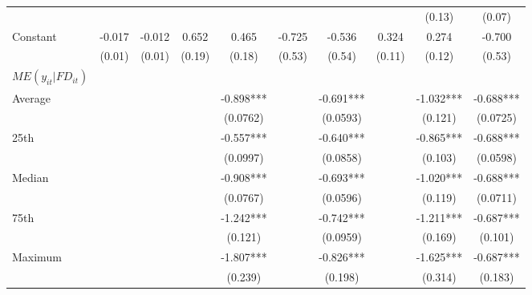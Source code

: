 \documentclass[12pt, a4paper]{article}
\begin{document}
\begin{table}[htbp]
\begin{threeparttable}
{\begin{tabular}{l*{9}{c}}
				&                     &                     &                     &                     &                     &                     &                     &      (0.13)         &      (0.07)         \\
				Constant            &      -0.017         &      -0.012         &       0.652\sym{**} &       0.465\sym{*}  &      -0.725         &      -0.536         &       0.324\sym{**} &       0.274\sym{*}  &      -0.700         \\
				&      (0.01)         &      (0.01)         &      (0.19)         &      (0.18)         &      (0.53)         &      (0.54)         &      (0.11)         &      (0.12)         &      (0.53)         \\
				\hline
				$ME(y_{it}|FD_{it})$ \\
				Average&&&&	-0.898***	&&	-0.691***	&&	-1.032***	&	-0.688***\\
				&&&&(0.0762) 	&&	(0.0593)  && 		(0.121)   &		(0.0725)   \\
				
				25th&&&&	-0.557***	&&	-0.640***	&&	-0.865***	&	-0.688***\\
				&&&&(0.0997)   &&		(0.0858)   &&		(0.103)   	&	(0.0598) \\  
				
				Median&&&&	-0.908***	&&	-0.693***	&&	-1.020***	&	-0.688***\\
				&&&&(0.0767)   &&		(0.0596)   	&&	(0.119)   	&	(0.0711)   \\
				
				75th&&&&	-1.242***	&&	-0.742***	&&	-1.211***	&	-0.687***\\
				&&&&(0.121)  &&		(0.0959)   	&&	(0.169)   	&	(0.101)   \\
				
				Maximum	&&&&-1.807***	&&	-0.826***	&&	-1.625***	&	-0.687***\\
				&&&&(0.239)   &&		(0.198)   &&		(0.314)   	&	(0.183)  \\ 
				
				
				

\end{tabular}}
\end{threeparttable}
\end{table}
\end{document}
